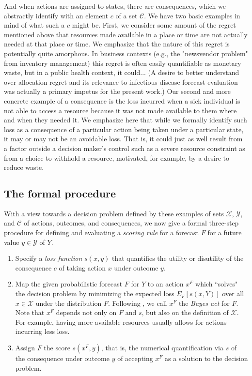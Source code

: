 \documentclass{article}
\begin{document}
And when actions are assigned to states, there are consequences, which we abstractly identify with an element $c$ of a set $\mathcal{C}$. We have two basic examples in mind of what such a $c$ might be.   First, we consider some amount of the regret mentioned above that resources made available in a place or time are not actually needed at that place or time. We emphasize that the nature of this regret is potentially quite amorphous.  In business contexts (e.g., the "newsvendor problem" from inventory management) this regret is often easily quantifiable as monetary waste, but in a public health context, it could... (A desire to better understand over-allocation regret and its relevance to infectious disease forecast evaluation was actually a primary impetus for the present work.) 
Our second and more concrete example of a consequence is the loss incurred when a sick individual is not able to access a resource because it was not made available to them where and when they needed it.   We emphasize here that while we formally identify such loss as a consequence of a particular action being taken under a particular state, it may or may not be an avoidable loss.  That is, it could just as well result from a factor outside a decision maker's control such as a severe resource constraint as from a choice to withhold a resource, motivated, for example, by a desire to reduce waste.

\subsection{The formal procedure}

With a view towards a decision problem defined by these examples of sets $\mathcal{X}$, $\mathcal{Y}$, and $\mathcal{C}$ of actions, outcomes, and consequences, we now give a formal three-step procedure for defining and evaluating a \emph{scoring rule} for a forecast $F$ for a future value $y \in \mathcal{Y}$ of $Y$.

\begin{enumerate}
\item Specify a \emph{loss function} $s(x,y)$ that quantifies the utility or disutility of the consequence $c$ of taking action $x$ under outcome $y$.
\item Map the given probabilistic forecast $F$ for $Y$ to an action $x^F$ which ``solves" the decision problem by minimizing the expected loss $E_{F}[s(x,Y)]$ over all $x \in \mathcal{X}$ under the distribution $F$.  Following \cite{dawid2007geometry}, we call $x^F$ the \emph{Bayes act} for $F$. Note that $x^F$ depends not only on $F$ and $s$, but also on the definition of $\mathcal{X}$. For example, having more available resources usually allows for actions incurring less loss.   
\item Assign $F$ the score $s(x^F,y)$, that is, the numerical quantification via $s$ of the consequence under outcome $y$ of accepting $x^F$ as a solution to the decision problem.
\end{enumerate}{}
\end{document}
